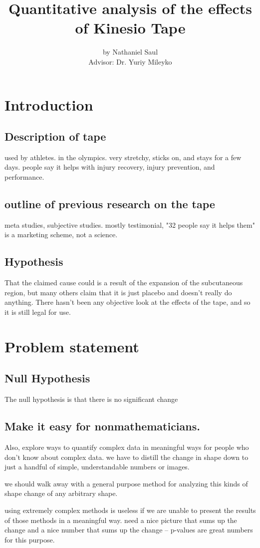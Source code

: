 \documentclass[letterpaper, 12 pt, conference]{ieeeconf}  %
\title{\LARGE  Quantitative analysis of the effects of Kinesio Tape}%
\author{by Nathaniel Saul \\ Advisor: Dr. Yuriy Mileyko}
\begin{document}
\section{Introduction}
\subsection{Description of tape}
used by athletes.  in the olympics.  very stretchy, sticks on, and stays for a few days. people say it helps with injury recovery, injury prevention, and performance.
\subsection{outline of previous research on the tape}
meta studies, subjective studies.  mostly testimonial,  "32 people say it helps them" is a marketing scheme, not a science.
\subsection{Hypothesis}
That the claimed cause could is a result of the expansion of the subcutaneous region, but many others claim that it is just placebo and doesn't really do anything.  There hasn't been any objective look at the effects of the tape, and so it is still legal for use.  

\section{Problem statement}
\subsection{Null Hypothesis}
The null hypothesis is that there is no significant change
\subsection{Make it easy for nonmathematicians.}
  Also, explore ways to quantify complex data in meaningful ways for people who don't know about complex data.
we have to distill the change in shape down to just a handful of simple, understandable numbers or images.

we should walk away with a general purpose method for analyzing this kinds of shape change of any arbitrary shape.


using extremely complex methods is useless if we are unable to present the results of those methods in a meaningful way.   need a nice picture that sums up the change and a nice number that sums up the change -- p-values are great numbers for this purpose.  
\end{document}
